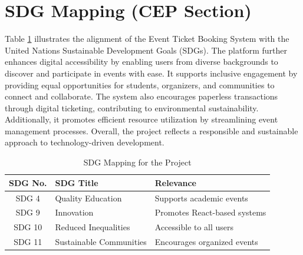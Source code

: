 \documentclass[12pt]{report}
\begin{document}
\section{SDG Mapping (CEP Section)}

Table \ref{tab:sdg_mapping} illustrates the alignment of the Event Ticket Booking System with the United Nations Sustainable Development Goals (SDGs). The platform further enhances digital accessibility by enabling users from diverse backgrounds to discover and participate in events with ease. It supports inclusive engagement by providing equal opportunities for students, organizers, and communities to connect and collaborate. The system also encourages paperless transactions through digital ticketing, contributing to environmental sustainability. Additionally, it promotes efficient resource utilization by streamlining event management processes. Overall, the project reflects a responsible and sustainable approach to technology-driven development.


\begin{table}[H]
\centering
\renewcommand{\arraystretch}{1.4}
\setlength{\tabcolsep}{6pt}

\begin{tabular}{|c|l|p{7cm}|}
\hline
\textbf{SDG No.} & \textbf{SDG Title} & \textbf{Relevance} \\
\hline
SDG 4 & Quality Education & Supports academic events \\
\hline
SDG 9 & Innovation & Promotes React-based systems \\
\hline
SDG 10 & Reduced Inequalities & Accessible to all users \\
\hline
SDG 11 & Sustainable Communities & Encourages organized events \\
\hline
\end{tabular}

\caption{ SDG Mapping for the Project}
\label{tab:sdg_mapping}
\end{table}
\end{document}
